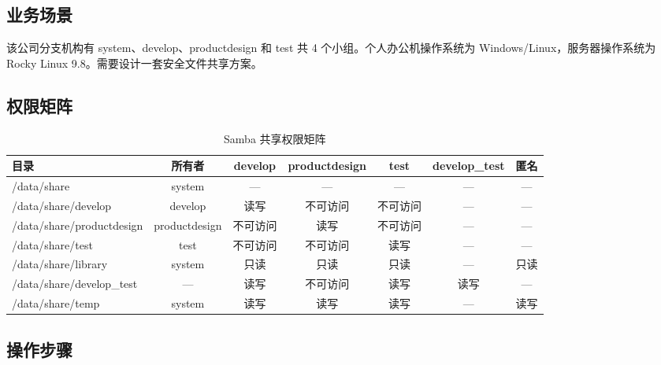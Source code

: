 \documentclass[12pt,a4paper]{ctexart}
\begin{document}
\subsection{业务场景}

该公司分支机构有 system、develop、productdesign 和 test 共 4 个小组。个人办公机操作系统为 Windows/Linux，服务器操作系统为 Rocky Linux 9.8。需要设计一套安全文件共享方案。

\subsection{权限矩阵}

\bgroup\small
\begin{table}[h]
\centering
\begin{tabular}{lcccccc}
\toprule
目录        & 所有者 & develop & productdesign & test & develop\_test & 匿名 \\
\midrule
/data/share      & system    & ---      & ---           & ---  & ---   & --- \\
/data/share/develop & develop  & 读写     & 不可访问       & 不可访问 & --- & --- \\
/data/share/productdesign & productdesign & 不可访问 & 读写   & 不可访问 & ---   & --- \\
/data/share/test & test      & 不可访问  & 不可访问        & 读写   & ---   & --- \\
/data/share/library & system  & 只读     & 只读          & 只读   & ---   & 只读 \\
/data/share/develop\_test & --- & 读写    & 不可访问        & 读写   & 读写   & --- \\
/data/share/temp & system    & 读写     & 读写          & 读写   & ---   & 读写 \\
\bottomrule
\end{tabular}
\caption{Samba 共享权限矩阵}
\end{table}
\egroup

\subsection{操作步骤}
\end{document}
